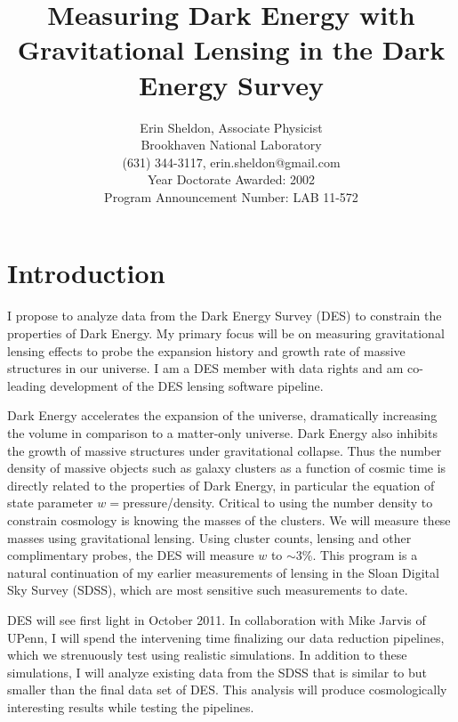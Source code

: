 \documentclass[12pt]{article}
\begin{document}
\title{Measuring Dark Energy with Gravitational Lensing in the Dark Energy Survey}
\author{Erin Sheldon, Associate Physicist\\
Brookhaven National Laboratory\\
(631) 344-3117, erin.sheldon@gmail.com\\
Year Doctorate Awarded: 2002\\
Program Announcement Number: LAB 11-572}

\date{}
\maketitle

\section{Introduction}
I propose to analyze data from the Dark Energy Survey (DES) to constrain the
properties of Dark Energy.  My primary focus will be on measuring gravitational
lensing effects to probe the expansion history and growth rate of massive
structures in our universe.  I am a DES member with data rights and am co-leading 
development of the DES lensing software pipeline.

Dark Energy accelerates the expansion of the universe, dramatically increasing
the volume in comparison to a matter-only universe.  Dark Energy also inhibits
the growth of massive structures under gravitational collapse.  Thus the number
density of massive objects such as galaxy clusters as a function of cosmic time
is directly related to the properties of Dark Energy, in particular the
equation of state parameter $w=$pressure/density.  Critical to using the number
density to constrain cosmology is knowing the masses of the clusters. We will
measure these masses using gravitational lensing.  Using cluster counts,
lensing and other complimentary probes, the DES will measure $w$ to $\sim$3\%.
This program is a natural continuation of my earlier measurements of lensing in
the Sloan Digital Sky Survey (SDSS), which are most sensitive such measurements
to date.

DES will see first light in October 2011.  In collaboration with Mike Jarvis of
UPenn, I will spend the intervening time finalizing our data reduction
pipelines, which we strenuously test using realistic simulations.  In addition
to these simulations, I will analyze existing data from the SDSS that is
similar to but smaller than the final data set of DES.  This analysis will
produce cosmologically interesting results while testing the pipelines.
\end{document}
